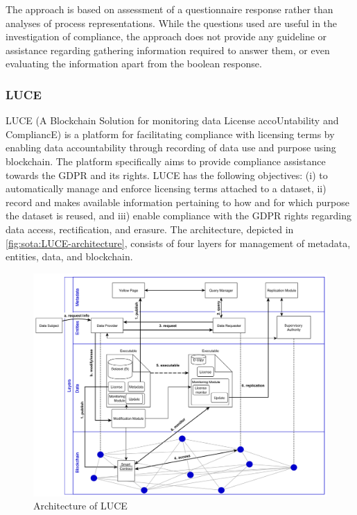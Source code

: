 The approach is based on assessment of a questionnaire response rather than analyses of process representations. While the questions used are useful in the investigation of compliance, the approach does not provide any guideline or assistance regarding gathering information required to answer them, or even evaluating the information apart from the boolean response.

\subsubsection{LUCE}
LUCE \cite{havelange_luce:_2019} (A Blockchain Solution for monitoring data License accoUntability and CompliancE) is a platform for facilitating compliance with licensing terms by enabling data accountability through recording of data use and purpose using blockchain. The platform specifically aims to provide compliance assistance towards the GDPR and its rights. LUCE has the following objectives: (i) to automatically manage and enforce licensing terms attached to a dataset, ii) record and makes available information pertaining to how and for which purpose the dataset is reused, and iii) enable compliance with the GDPR rights regarding data access, rectification, and erasure. The architecture, depicted in \autoref{fig:sota:LUCE-architecture}, consists of four layers for management of metadata, entities, data, and blockchain. 
\begin{figure}[htbp]
    \centering
    \includegraphics[width=0.8\linewidth]{img/LUCE_architecture.png}
    \caption{Architecture of LUCE \cite{havelange_luce:_2019}}
    \label{fig:sota:LUCE-architecture}
\end{figure}

